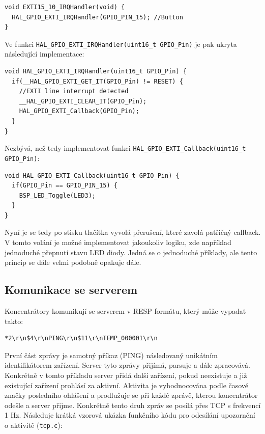 \begin{verbatim}
void EXTI15_10_IRQHandler(void) {
  HAL_GPIO_EXTI_IRQHandler(GPIO_PIN_15); //Button
}
\end{verbatim}

Ve funkci \texttt{HAL\_GPIO\_EXTI\_IRQHandler(uint16\_t GPIO\_Pin)} je pak ukryta následující implementace:

\begin{verbatim}
void HAL_GPIO_EXTI_IRQHandler(uint16_t GPIO_Pin) {
  if(__HAL_GPIO_EXTI_GET_IT(GPIO_Pin) != RESET) {
    //EXTI line interrupt detected
    __HAL_GPIO_EXTI_CLEAR_IT(GPIO_Pin);
    HAL_GPIO_EXTI_Callback(GPIO_Pin);
  }
}
\end{verbatim}

Nezbývá, než tedy implementovat funkci \texttt{HAL\_GPIO\_EXTI\_Callback(uint16\_t GPIO\_Pin)}:

\begin{verbatim}
void HAL_GPIO_EXTI_Callback(uint16_t GPIO_Pin) {
  if(GPIO_Pin == GPIO_PIN_15) {
    BSP_LED_Toggle(LED3);
  }
}
\end{verbatim}

Nyní je se tedy po stisku tlačítka vyvolá přerušení, které zavolá patřičný callback. V tomto volání je možné implementovat jakoukoliv logiku, zde například jednoduché přepnutí stavu LED diody. Jedná se o jednoduché příklady, ale tento princip se dále velmi podobně opakuje dále.

\subsection{Komunikace se serverem}
Koncentrátory komunikují se serverem v RESP formátu, který může vypadat takto:

\begin{verbatim}
*2\r\n$4\r\nPING\r\n$11\r\nTEMP_000001\r\n
\end{verbatim}

První část zprávy je samotný příkaz (PING) následovaný unikátním identifikátorem zařízení. Server tyto zprávy přijímá, parsuje a dále zpracovává. Konkrétně v tomto příkladu server přidá další zařízení, pokud neexistuje a již existující zařízení prohlásí za aktivní. Aktivita je vyhodnocována podle časové značky posledního ohlášení a prodlužuje se při každé zprávě, kterou koncentrátor odešle a server přijme. Konkrétně tento druh zpráv se posílá přes TCP s frekvencí 1 Hz. Následuje krátká vzorová ukázka funkčního kódu pro odesílání upozornění o aktivitě (\texttt{tcp.c}):

